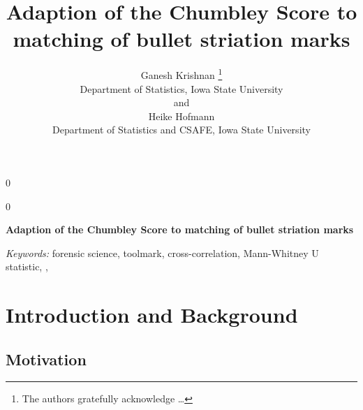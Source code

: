 \documentclass[12pt]{article}
\newcommand{\blind}{0}
\begin{document}
\def\spacingset#1{\renewcommand{\baselinestretch}%
{#1}\small\normalsize} \spacingset{1}



\blind
{
  \title{\bf Adaption of the Chumbley Score to matching of bullet striation marks}

  \author{
        Ganesh Krishnan \thanks{The authors gratefully acknowledge \ldots{}} \\
    Department of Statistics, Iowa State University\\
     and \\     Heike Hofmann \\
    Department of Statistics and CSAFE, Iowa State University\\
      }
  \maketitle
} \fi

\blind
{
  \bigskip
  \bigskip
  \bigskip
  \begin{center}
    {\LARGE\bf Adaption of the Chumbley Score to matching of bullet striation marks}
  \end{center}
  \medskip
} \fi

\bigskip
\begin{abstract}

\end{abstract}

\noindent%
{\it Keywords:} forensic science, toolmark, cross-correlation, Mann-Whitney U statistic, , 
\vfill

\newpage
\spacingset{1.45} %

\newcommand{\hh}[1]{{\textcolor{orange}{#1}}}
\newcommand{\gk}[1]{{\textcolor{blue}{#1}}}
\newcommand{\cited}[1]{{\textcolor{red}{#1}}}
\setlength\parindent{0pt}

\tableofcontents
\newpage

\hypertarget{introduction-and-background}{%
\section{Introduction and
Background}\label{introduction-and-background}}

\hypertarget{motivation}{%
\subsection{Motivation}\label{motivation}}
\end{document}
